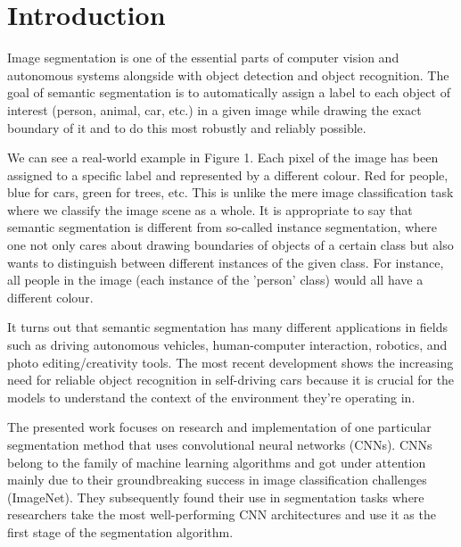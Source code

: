 \chapter{Introduction}
Image segmentation is one of the essential parts of computer vision and autonomous systems alongside with object detection and object recognition. The goal of semantic segmentation is to automatically assign a label to each object of interest (person, animal, car, etc.) in a given image while drawing the exact boundary of it and to do this most robustly and reliably possible. 

We can see a real-world example in Figure 1. Each pixel of the image has been assigned to a specific label and represented by a different colour. Red for people, blue for cars, green for trees, etc. This is unlike the mere image classification task where we classify the image scene as a whole. It is appropriate to say that semantic segmentation is different from so-called instance segmentation, where one not only cares about drawing boundaries of objects of a certain class but also wants to distinguish between different instances of the given class. For instance, all people in the image (each instance of the 'person' class) would all have a different colour.

It turns out that semantic segmentation has many different applications in fields such as driving autonomous vehicles, human-computer interaction, robotics, and photo editing/creativity tools. The most recent development shows the increasing need for reliable object recognition in self-driving cars because it is crucial for the models to understand the context of the environment they’re operating in.

The presented work focuses on research and implementation of one particular segmentation method that uses convolutional neural networks (CNNs). CNNs belong to the family of machine learning algorithms and got under attention mainly due to their groundbreaking success in image classification challenges (ImageNet). They subsequently found their use in segmentation tasks where researchers take the most well-performing CNN architectures and use it as the first stage of the segmentation algorithm.

